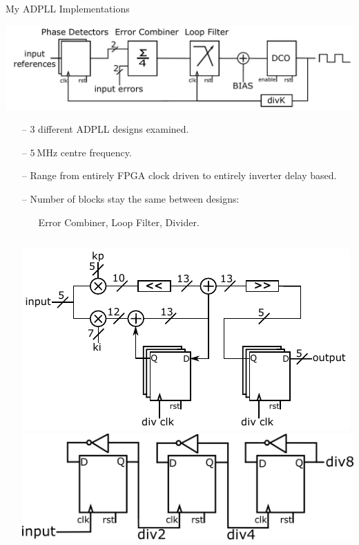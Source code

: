 \documentclass{beamer}
\begin{document}
\begin{frame}{My ADPLL Implementations}
 	\begin{center}
 		\includegraphics[scale=0.3]{../network_adpll}
 		\vspace{-0.67 cm}
 	\end{center}		
	\begin{itemize}
		\item[--]
			3 different ADPLL designs examined.
		\item[--]
			$5~\si{\mega\hertz}$ centre frequency.
		\item[--]
			Range from entirely FPGA clock driven to entirely inverter delay based.
		\item[--]
			Number of blocks stay the same between designs:
			\begin{itemize}
				\item[]
					Error Combiner,
					Loop Filter,
					Divider.
			\end{itemize}
		\begin{columns}
			\includegraphics[width=1\linewidth]{../integer_lf}
			\includegraphics[width=1\linewidth]{../divider2}
		\end{columns}			
	\end{itemize}
\end{frame}
\end{document}
